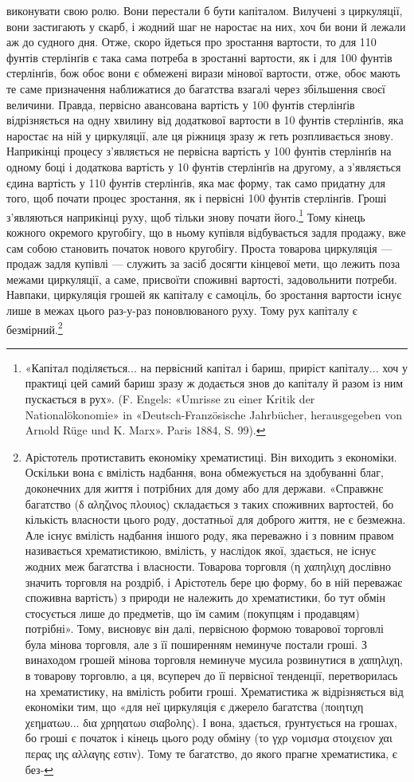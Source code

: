 виконувати свою ролю. Вони перестали б бути капіталом. Вилучені
з циркуляції, вони застигають у скарб, і жодний шаг не наростає
на них, хоч би вони й лежали аж до судного дня. Отже,
скоро йдеться про зростання вартости, то для 110 фунтів стерлінґів
є така сама потреба в зростанні вартости, як і для 100 фунтів
стерлінґів, бож обоє вони є обмежені вирази мінової вартости,
отже, обоє мають те саме призначення наближатися до багатства
взагалі через збільшення своєї величини. Правда, первісно авансована
вартість у 100 фунтів стерлінґів відрізняється на одну хвилину
від додаткової вартости в 10 фунтів стерлінґів, яка наростає
на ній у циркуляції, але ця ріжниця зразу ж геть розпливається
знову. Наприкінці процесу з’являється не первісна вартість
у 100 фунтів стерлінґів на одному боці і додаткова вартість у
10 фунтів стерлінґів на другому, а з’являється єдина вартість у
110 фунтів стерлінґів, яка має форму, так само придатну для того,
щоб почати процес зростання, як і первісні 100 фунтів стерлінґів.
Гроші з’являються наприкінці руху, щоб тільки знову почати
його.\footnote{
«Капітал поділяється... на первісний капітал і бариш, приріст
капіталу... хоч у практиці цей самий бариш зразу ж додається знов до
капіталу й разом із ним пускається в рух». (F. Engels: «Umrisse zu
einer Kritik der Nationalökonomie» in «Deutsch-Französische Jahrbücher,
herausgegeben von Arnold Rüge und K. Marx». Paris 1884, S. 99).
} Тому кінець кожного окремого кругобігу, що в ньому
купівля відбувається задля продажу, вже сам собою становить
початок нового кругобігу. Проста товарова циркуляція — продаж
задля купівлі — служить за засіб досягти кінцевої мети,
що лежить поза межами циркуляції, а саме, присвоїти споживні
вартості, задовольнити потреби. Навпаки, циркуляція грошей
як капіталу є самоціль, бо зростання вартости існує лише в межах
цього раз-у-раз поновлюваного руху. Тому рух капіталу є
безмірний.\footnote{
Арістотель протиставить економіку хрематистиці. Він виходить
з економіки. Оскільки вона є вмілість надбання, вона обмежується на здобуванні
благ, доконечних для життя і потрібних для дому або для держави.
«Справжнє багатство (δ αληζινος πλουιος) складається з таких споживних
вартостей, бо кількість власности цього роду, достатньої для
доброго життя, не є безмежна. Але існує вмілість надбання іншого роду,
яка переважно і з повним правом називається хрематистикою, вмілість,
у наслідок якої, здається, не існує жодних меж багатства і власности.
Товарова торговля (η χαπηλιχη    дослівно значить торговля на роздріб,
і Арістотель бере цю форму, бо в ній переважає споживна вартість) з природи
не належить до хрематистики, бо тут обмін стосується лише до предметів,
що їм самим (покупцям і продавцям) потрібні». Тому, висновує
він далі, первісною формою товарової торговлі була мінова торговля,
але з її поширенням неминуче постали гроші. З винаходом грошей мінова
торговля неминуче мусила розвинутися в χαπηλιχη, в товарову торговлю,
а ця, всупереч до її первісної тенденції, перетворилась на хрематистику,
на вмілість робити гроші. Хрематистика ж відрізняється від економіки
тим, що «для неї циркуляція є джерело багатства (ποιητιχη χεηματωυ... δια χρηηατωυ σιαβολης). І
вона, здається, ґрунтується на грошах, бо гроші є початок і кінець цього роду обміну (το γχρ νομισμα
στοιχειον χαι περας ιης αλλαγης εστιν). Тому те багатство, до якого прагне хрематистика, є без-
}
